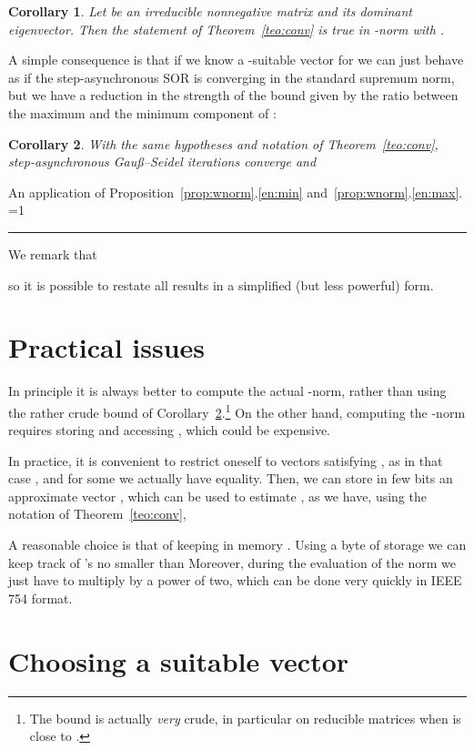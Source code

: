 \documentclass{article}
\newcommand{\Gauss}{Gau\ss}
\newcommand{\1}{\mathbf 1}
\newtheorem{corollary}{Corollary}
\newcounter{noqed}
\newcommand{\qed}{ \ifmmode\mbox{ }\fi\rule[-.05em]{.3em}{.7em}\setcounter{noqed}{0}}
\newenvironment{proof}[1][{}]{\noindent{\bf Proof#1. }\setcounter{noqed}{1}}{\ifnum\value{noqed}=1\qed\fi\par\medskip}
\begin{document}
\begin{corollary}
\label{cor:bound}
Let  be an irreducible nonnegative matrix and  its dominant eigenvector. Then the statement of Theorem~\ref{teo:conv} 
is true in -norm with .
\end{corollary}

A simple consequence is that if we know a -suitable vector  for
 we can just behave as if the step-asynchronous SOR is converging in the
standard supremum norm, but we have a reduction in the strength 
of the bound given by the ratio between the maximum
and the minimum component of :
\begin{corollary}
\label{cor:bound}
With the same hypotheses and notation of Theorem~\ref{teo:conv}, step-asynchronous \Gauss--Seidel iterations converge and

\end{corollary}
\begin{proof}
An application of Proposition~\ref{prop:wnorm}.\ref{en:min}
and~\ref{prop:wnorm}.\ref{en:max}.
\end{proof}

We remark that 

so it is possible to restate all results in a simplified (but less powerful)
form.


\section{Practical issues}
In principle it is always better to compute the actual -norm,
rather than using the rather crude bound of Corollary~\ref{cor:bound}.\footnote{The bound is actually \emph{very} crude, in particular on
reducible matrices when  is close to .} On the other
hand, computing the -norm requires storing and accessing , which could be expensive. 

In practice, it is convenient to restrict oneself to vectors  satisfying , as in that case
, and for some  we actually have equality.
Then, we can store in few bits an approximate vector , which can be used 
to estimate , as we have, using the notation of Theorem~\ref{teo:conv},

A reasonable choice is that of keeping in memory . Using a byte of storage we can keep track of 's no smaller than
Moreover, during the evaluation of the norm we just have to multiply by a power
of two, which can be done very quickly in IEEE 754 format.



\section{Choosing a suitable vector}
\label{sec:choosing}
\end{document}
